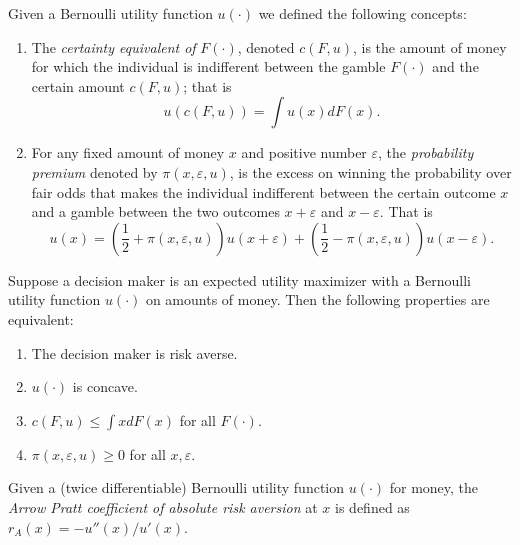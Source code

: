 \begin{defn}
    Given a Bernoulli utility function $u(\cdot)$ we defined the following concepts:
    \begin{enumerate}
        \item The \emph{certainty equivalent of} $F(\cdot)$, denoted $c(F, u)$, is the amount of money for which the individual is indifferent between the gamble $F(\cdot)$ and the certain amount $c(F, u)$; that is 
        \begin{equation*}
            u\left(c(F, u)\right) = \int u(x) dF(x).
        \end{equation*}

        \item For any fixed amount of money $x$ and positive number $\varepsilon$, the \emph{probability premium} denoted by $\pi(x, \varepsilon, u)$, is the excess on winning the probability over fair odds that makes the individual indifferent between the certain outcome $x$ and a gamble between the two outcomes $x + \varepsilon$ and $x - \varepsilon$. That is 
        \begin{equation*}
            u(x) = \left( \frac{1}{2} + \pi(x, \varepsilon, u)\right) u(x + \varepsilon) + \left( \frac{1}{2} - \pi(x, \varepsilon, u)\right) u(x - \varepsilon).
        \end{equation*}
    \end{enumerate}
\end{defn}

\begin{prop}
    Suppose a decision maker is an expected utility maximizer with a Bernoulli utility function $u(\cdot)$ on amounts of money. Then the following properties are equivalent:
    \begin{enumerate}
        \item The decision maker is risk averse.
        \item $u(\cdot)$ is concave.
        \item $c(F, u) \leq \int x dF(x)$ for all $F(\cdot)$.
        \item $\pi(x, \varepsilon, u) \geq 0$ for all $x, \varepsilon$.
    \end{enumerate}
\end{prop}

\begin{defn}
    Given a (twice differentiable) Bernoulli utility function $u(\cdot)$ for money, the \emph{Arrow Pratt coefficient of absolute risk aversion} at $x$ is defined as $r_A(x) = -u''(x) / u'(x)$.
\end{defn}

